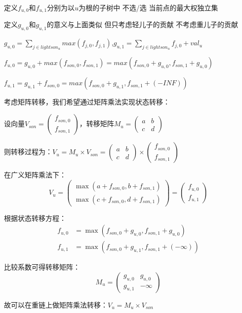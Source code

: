 \documentclass[a4paper,fontset=none]{ctexart}
\begin{document}
定义$f_{u,0}$和$f_{u,1}$分别为以$u$为根的子树中 不选/选 当前点的最大权独立集

定义$g_{u,0}$和$g_{u,1}$的意义与上面类似 但只考虑轻儿子的贡献 不考虑重儿子的贡献

$g_{u,0}=\sum\limits_{j\in lightson_u}max(f_{j,0},f_{j,1})$,$g_{u,1}={\sum\limits_{j\in lightson_u}f_{j,0}}+val_u$

$f_{u,0}=g_{u,0}+max(f_{son,0},f_{son,1})=max(f_{son,0}+g_{u,0},f_{son,1}+g_{u,0})$

$f_{u,1}=g_{u,1}+f_{son,0}=max(f_{son,0}+g_{u,1},f_{son,1}+(-INF))$

考虑矩阵转移，我们希望通过矩阵乘法实现状态转移：

设向量$V_{son} = \begin{pmatrix}f_{son,0} \\ f_{son,1}\end{pmatrix}$，转移矩阵$M_u = \begin{pmatrix}a&b\\c&d\end{pmatrix}$

则转移过程为：$V_u = M_u \times V_{son} = \begin{pmatrix}a&b\\c&d\end{pmatrix} \times \begin{pmatrix}f_{son,0} \\ f_{son,1}\end{pmatrix}$

在广义矩阵乘法下：
$$V_u = \begin{pmatrix}\max(a+f_{son,0}, b+f_{son,1}) \\ \max(c+f_{son,0}, d+f_{son,1})\end{pmatrix} = \begin{pmatrix}f_{u,0} \\ f_{u,1}\end{pmatrix}$$

根据状态转移方程：
\begin{align}
f_{u,0} &= \max(f_{son,0}+g_{u,0}, f_{son,1}+g_{u,0}) \\
f_{u,1} &= \max(f_{son,0}+g_{u,1}, f_{son,1}+(-\infty))
\end{align}

比较系数可得转移矩阵：
$$M_u = \begin{pmatrix}g_{u,0} & g_{u,0} \\ g_{u,1} & -\infty\end{pmatrix}$$

故可以在重链上做矩阵乘法转移：$V_u = M_u \times V_{son}$
\end{document}
